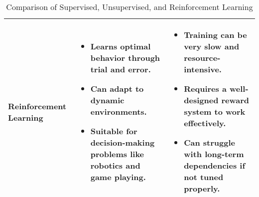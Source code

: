 \begin{table}[H]
\begin{tabular}{| m{3.5cm} | m{5cm} | m{5cm} |}
            \hline
            \textbf{Reinforcement Learning} & 
            \begin{itemize}
                  \item Learns optimal behavior through trial and error.
                  \item Can adapt to dynamic environments.
                  \item Suitable for decision-making problems like robotics and game playing.
            \end{itemize} & 
            \begin{itemize}
                  \item Training can be very slow and resource-intensive.
                  \item Requires a well-designed reward system to work effectively.
                  \item Can struggle with long-term dependencies if not tuned properly.
            \end{itemize} \\ 
            \hline
      \end{tabular}
      \caption{Comparison of Supervised, Unsupervised, and Reinforcement Learning}
      \label{tab:ml_comparison}
\end{table}
